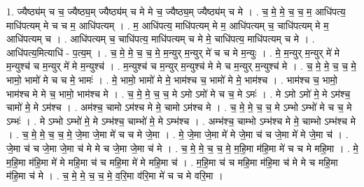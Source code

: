 \documentclass[17pt]{extarticle}
\begin{document}
1. ज्यैष्ठ्य॑म् च च॒ ज्यैष्ठ्य॒म् ज्यैष्ठ्य॑म् च मे मे च॒ ज्यैष्ठ्य॒म् ज्यैष्ठ्य॑म् च मे । . च॒ मे॒ मे॒ च॒ च॒ म॒ आधि॑पत्य॒ माधि॑पत्यम् मे च च म॒ आधि॑पत्यम् । . म॒ आधि॑पत्य॒ माधि॑पत्यम् मे म॒ आधि॑पत्यम् च॒ चाधि॑पत्यम् मे म॒ आधि॑पत्यम् च । . आधि॑पत्यम् च॒ चाधि॑पत्य॒ माधि॑पत्यम् च मे मे॒ चाधि॑पत्य॒ माधि॑पत्यम् च मे । . आधि॑पत्य॒मित्याधि॑ - प॒त्य॒म् । . च॒ मे॒ मे॒ च॒ च॒ मे॒ म॒न्युर् म॒न्युर् मे॑ च च मे म॒न्युः । . मे॒ म॒न्युर् म॒न्युर् मे॑ मे म॒न्युश्च॑ च म॒न्युर् मे॑ मे म॒न्युश्च॑ । . म॒न्युश्च॑ च म॒न्युर् म॒न्युश्च॑ मे मे च म॒न्युर् म॒न्युश्च॑ मे । . च॒ मे॒ मे॒ च॒ च॒ मे॒ भामो॒ भामो॑ मे च च मे॒ भामः॑ । . मे॒ भामो॒ भामो॑ मे मे॒ भाम॑श्च च॒ भामो॑ मे मे॒ भाम॑श्च । . भाम॑श्च च॒ भामो॒ भाम॑श्च मे मे च॒ भामो॒ भाम॑श्च मे । . च॒ मे॒ मे॒ च॒ च॒ मे ऽमो ऽमो॑ मे च च॒ मे ऽमः॑ । . मे ऽमो ऽमो॑ मे॒ मे ऽम॑श्च॒ चामो॑ मे॒ मे ऽम॑श्च । . अम॑श्च॒ चामो ऽम॑श्च मे मे॒ चामो ऽम॑श्च मे । . च॒ मे॒ मे॒ च॒ च॒ मे ऽम्भो ऽम्भो॑ मे च च॒ मे ऽम्भः॑ । . मे ऽम्भो ऽम्भो॑ मे॒ मे ऽम्भ॑श्च॒ चाम्भो॑ मे॒ मे ऽम्भ॑श्च । . अम्भ॑श्च॒ चाम्भो ऽम्भ॑श्च मे मे॒ चाम्भो ऽम्भ॑श्च मे । . च॒ मे॒ मे॒ च॒ च॒ मे॒ जे॒मा जे॒मा मे॑ च च मे जे॒मा । . मे॒ जे॒मा जे॒मा मे॑ मे जे॒मा च॑ च जे॒मा मे॑ मे जे॒मा च॑ । . जे॒मा च॑ च जे॒मा जे॒मा च॑ मे मे च जे॒मा जे॒मा च॑ मे । . च॒ मे॒ मे॒ च॒ च॒ मे॒ म॒हि॒मा म॑हि॒मा मे॑ च च मे महि॒मा । . मे॒ म॒हि॒मा म॑हि॒मा मे॑ मे महि॒मा च॑ च महि॒मा मे॑ मे महि॒मा च॑ । . म॒हि॒मा च॑ च महि॒मा म॑हि॒मा च॑ मे मे च महि॒मा म॑हि॒मा च॑ मे । . च॒ मे॒ मे॒ च॒ च॒ मे॒ व॒रि॒मा व॑रि॒मा मे॑ च च मे वरि॒मा । \newline
\end{document}
